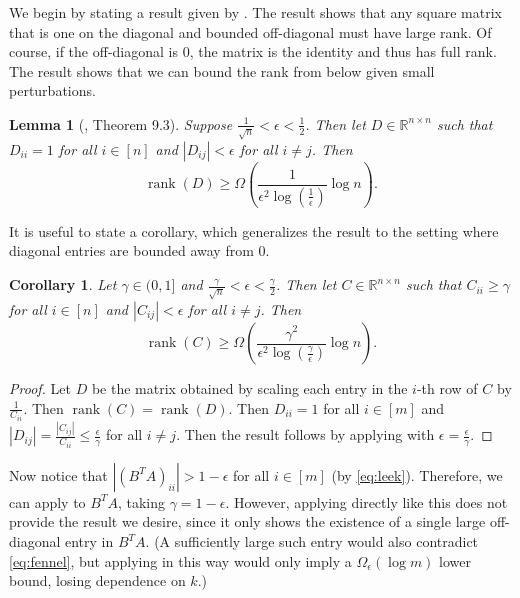 \documentclass[11pt]{article}
\newtheorem{corollary}[theorem]{Corollary}
\newtheorem{lemma}[theorem]{Lemma}
\newcommand{\RR}{\mathbb{R}}
\DeclareMathOperator{\rank}{rank}
\begin{document}
We begin by stating a result given by \cite{alon2003problems}. The result shows that any square matrix that is one on the diagonal and bounded off-diagonal must have large rank. Of course, if the off-diagonal is 0, the matrix is the identity and thus has full rank. The result shows that we can bound the rank from below given small perturbations.
\begin{lemma}[\cite{alon2003problems}, Theorem 9.3]\label{lem:alon}
Suppose $\frac{1}{\sqrt{n}} < \epsilon < \frac{1}{2}$. Then let $D\in \RR^{n\times n}$ such that $D_{ii}=1$ for all $i\in [n]$ and $|D_{ij}| < \epsilon$ for all $i\neq j$. Then
\begin{equation}
    \rank(D) \ge \Omega\left(\frac{1}{\epsilon^2\log(\frac{1}{\epsilon})}\log n\right).
\end{equation}
\end{lemma}

It is useful to state a corollary, which generalizes the result to the setting where diagonal entries are bounded away from 0.
\begin{corollary}\label{lem:rank}
Let $\gamma \in (0,1]$ and $\frac{\gamma}{\sqrt{n}} < \epsilon < \frac{\gamma}{2}$. Then let $C\in \RR^{n\times n}$ such that $C_{ii}\ge \gamma$ for all $i\in [n]$ and $|C_{ij}| < \epsilon$ for all $i\neq j$. Then
\begin{equation}
    \rank(C) \ge \Omega\left(\frac{\gamma^2}{\epsilon^2\log(\frac{\gamma}{\epsilon})}\log n\right).
\end{equation}
\end{corollary}

\begin{proof}
    Let $D$ be the matrix obtained by scaling each entry in the $i$-th row of $C$ by $\frac{1}{C_{ii}}$. Then $\rank(C)=\rank(D)$. Then $D_{ii}=1$ for all $i\in [m]$ and $|D_{ij}| = \frac{|C_{ij}|}{C_{ii}}\le \frac{\epsilon}{\gamma}$ for all $i\neq j$. Then the result follows by applying  with $\epsilon = \frac{\epsilon}{\gamma}.$
\end{proof}

Now notice that $|(B^TA)_{ii}| > 1 - \epsilon$ for all $i\in [m]$ (by \eqref{eq:leek}). Therefore, we can apply  to $B^TA$, taking $\gamma = 1 - \epsilon.$ However, applying  directly like this does not provide the result we desire, since it only shows the existence of a single large off-diagonal entry in $B^TA$. (A sufficiently large such entry would also contradict \eqref{eq:fennel}, but applying  in this way would only imply a $\Omega_\epsilon (\log m)$ lower bound, losing dependence on $k$.)
\end{document}
